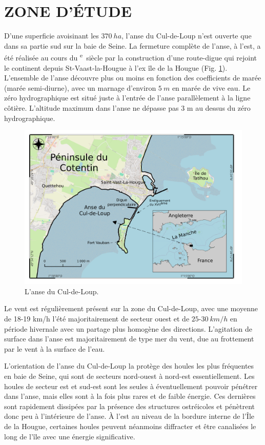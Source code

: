 \documentclass[10pt,a4paper,titlepage]{article}
\def\siecle#1{\textsc{\romannumeral #1}\textsuperscript{e}~siècle}
\begin{document}
    \section{ZONE D'ÉTUDE}
    \label{sec:adcl}

    D'une superficie avoisinant les $370~ha$, l'anse du Cul-de-Loup n'est ouverte que dans sa partie sud sur la baie de Seine. La fermeture complète de l'anse, à l'est, a été réalisée au cours du \siecle{17} par la construction d'une route-digue qui rejoint le continent depuis St-Vaast-la-Hougue à l'ex île de la Hougue (Fig. \ref{fig:carte-adcl}). L'ensemble de l'anse découvre plus ou moins en fonction des coefficients de marée (marée semi-diurne), avec un marnage d'environ $5~m$ en marée de vive eau. Le zéro hydrographique est situé juste à l'entrée de l'anse parallèlement à la ligne côtière. L'altitude maximum dans l'anse ne dépasse pas 3 m au dessus du zéro hydrographique.

    \begin{figure}[!h]
        \centering
        \includegraphics[width=0.8\linewidth]{../images/carte-ADCL}
        \caption[anse du Cul-de-Loup.]{L'anse du Cul-de-Loup.}
        \label{fig:carte-adcl}
    \end{figure}

    Le vent est régulièrement présent sur la zone du Cul-de-Loup, avec une moyenne de 18-19 km/h l'été majoritairement de secteur ouest et de $25$-$30~km/h$ en période hivernale avec un partage plus homogène des directions. L'agitation de surface dans l'anse est majoritairement de type mer du vent, due au frottement par le vent à la surface de l'eau.

    L'orientation de l'anse du Cul-de-Loup la protège des houles les plus fréquentes en baie de Seine, qui sont de secteurs nord-ouest à nord-est essentiellement. Les houles de secteur est et sud-est sont les seules à éventuellement pouvoir pénétrer dans l'anse, mais elles sont à la fois plus rares et de faible énergie. Ces dernières sont rapidement dissipées par la présence des structures ostréicoles et pénètrent donc peu à l'intérieure de l'anse. À l'est au niveau de la bordure interne de l'Île de la Hougue, certaines houles peuvent néanmoins diffracter et être canalisées le long de l'île avec une énergie significative.
\end{document}
